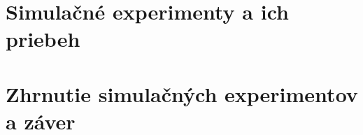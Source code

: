 \documentclass[12pt,a4paper,titlepage,final]{article}
\begin{document}
\section{Simulačné experimenty a ich priebeh}

\section{Zhrnutie simulačných experimentov a záver}
\end{document}
